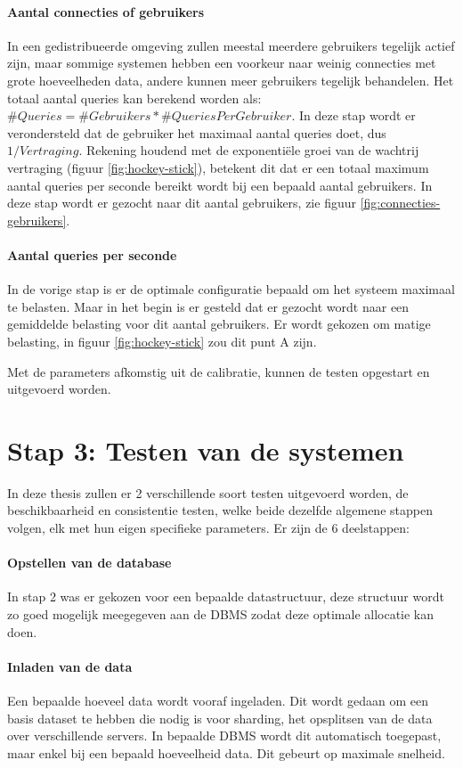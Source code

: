 \paragraph{Aantal connecties of gebruikers} In een gedistribueerde omgeving zullen meestal meerdere gebruikers tegelijk actief zijn, maar sommige systemen hebben een voorkeur naar weinig connecties met grote hoeveelheden data, andere kunnen meer gebruikers tegelijk behandelen. Het totaal aantal queries kan berekend worden als: $\#Queries = \#Gebruikers * \#QueriesPerGebruiker$. In deze stap wordt er verondersteld dat de gebruiker het maximaal aantal queries doet, dus $1/Vertraging$. Rekening houdend met de exponentiële groei van de wachtrij vertraging (figuur \ref{fig:hockey-stick}), betekent dit dat er een totaal maximum aantal queries per seconde bereikt wordt bij een bepaald aantal gebruikers. In deze stap wordt er gezocht naar dit aantal gebruikers, zie figuur \ref{fig:connecties-gebruikers}. 

\paragraph{Aantal queries per seconde} In de vorige stap is er de optimale configuratie bepaald om het systeem maximaal te belasten. Maar in het begin is er gesteld dat er gezocht wordt naar een gemiddelde belasting voor dit aantal gebruikers. Er wordt gekozen om matige belasting, in figuur \ref{fig:hockey-stick} zou dit punt A zijn. 

Met de parameters afkomstig uit de calibratie, kunnen de testen opgestart en uitgevoerd worden. 

\section{Stap 3: Testen van de systemen}
In deze thesis zullen er 2 verschillende soort testen uitgevoerd worden, de beschikbaarheid en consistentie testen, welke beide dezelfde algemene stappen volgen, elk met hun eigen specifieke parameters. Er zijn de 6 deelstappen: 

\paragraph{Opstellen van de database} In stap 2 was er gekozen voor een bepaalde datastructuur, deze structuur wordt zo goed mogelijk meegegeven aan de DBMS zodat deze optimale allocatie kan doen.

\paragraph{Inladen van de data} Een bepaalde hoeveel data wordt vooraf ingeladen. Dit wordt gedaan om een basis dataset te hebben die nodig is voor sharding, het opsplitsen van de data over verschillende servers. In bepaalde DBMS wordt dit automatisch toegepast, maar enkel bij een bepaald hoeveelheid data. Dit gebeurt op maximale snelheid. 

